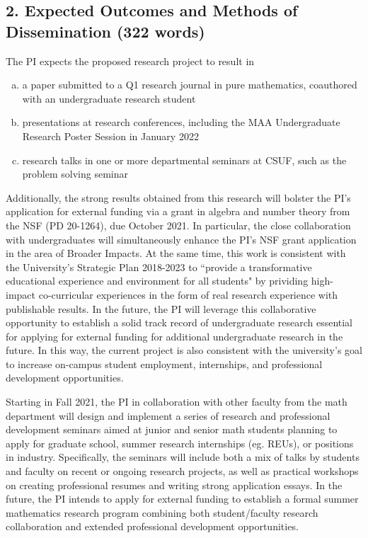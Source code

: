 \documentclass[12pt,letterpaper]{article}
\theoremstyle{definition}
\begin{document}
\subsection*{\hfil 2. Expected Outcomes and Methods of Dissemination (322 words)\hfil}

The PI expects the proposed research project to result in 
\begin{enumerate}[(a)]
\item a paper submitted to a Q1 research journal in pure mathematics, coauthored with an undergraduate research student
\item presentations at research conferences, including the MAA Undergraduate Research Poster Session in January 2022
\item research talks in one or more departmental seminars at CSUF, such as the problem solving seminar
\end{enumerate}
Additionally, the strong results obtained from this research will bolster the PI's application for external funding via a grant in algebra and number theory from the NSF (PD 20-1264), due October 2021.  In particular, the close collaboration with undergraduates will simultaneously enhance the PI's NSF grant application in the area of Broader Impacts.  At the same time, this work is consistent with the University's Strategic Plan 2018-2023 to ``provide a transformative educational experience and environment for all students" by prividing high-impact co-curricular experiences in the form of real research experience with publishable results.  In the future, the PI will leverage this collaborative opportunity to establish a solid track record of undergraduate research essential for applying for external funding for additional undergraduate research in the future.  In this way, the current project is also consistent with the university's goal to increase on-campus student employment, internships, and professional development opportunities.

Starting in Fall 2021, the PI in collaboration with other faculty from the math department will design and implement a series of research and professional development seminars aimed at junior and senior math students planning to apply for graduate school, summer research internships (eg. REUs), or positions in industry.  Specifically, the seminars will include both a mix of talks by students and faculty on recent or ongoing research projects, as well as practical workshops on creating professional resumes and writing strong application essays.  In the future, the PI intends to apply for external funding to establish a formal summer mathematics research program combining both student/faculty research collaboration and extended professional development opportunities.
\end{document}
